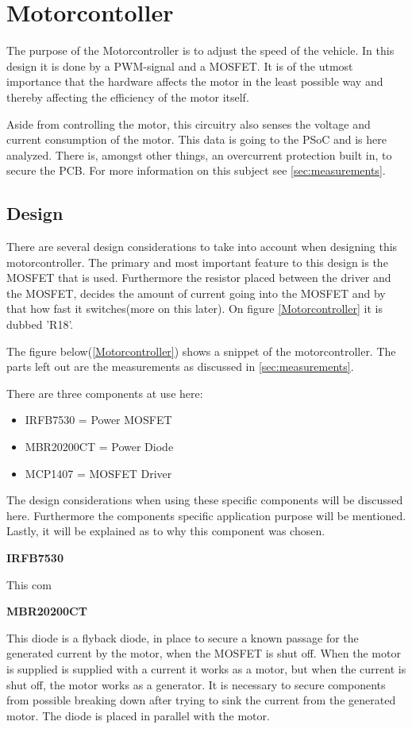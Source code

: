 \section{Motorcontoller}
The purpose of the Motorcontroller is to adjust the speed of the vehicle. In this design it is done by a PWM-signal and a MOSFET. It is of the utmost importance that the hardware affects the motor in the least possible way and thereby affecting the efficiency of the motor itself.

Aside from controlling the motor, this circuitry also senses the voltage and current consumption of the motor. This data is going to the PSoC and is here analyzed. There is, amongst other things, an overcurrent protection built in, to secure the PCB. For more information on this subject see \vref{sec:measurements}.

\subsection{Design}
There are several design considerations to take into account when designing this motorcontroller. The primary and most important feature to this design is the MOSFET that is used. Furthermore the resistor placed between the driver and the MOSFET, decides the amount of current going into the MOSFET and by that how fast it switches(more on this later). On figure \vref{Motorcontroller} it is dubbed 'R18'. 

The figure below(\vref{Motorcontroller}) shows a snippet of the motorcontroller. The parts left out are the measurements as discussed in \vref{sec:measurements}.

There are three components at use here:

\begin{itemize}
	\item{IRFB7530 = Power MOSFET}
	\item{MBR20200CT = Power Diode}
	\item{MCP1407 = MOSFET Driver}
\end{itemize}

The design considerations when using these specific components will be discussed here. Furthermore the components specific application purpose will be mentioned. Lastly, it will be explained as to why this component was chosen.  

\textbf{IRFB7530}

This com

\textbf{MBR20200CT}

This diode is a flyback diode, in place to secure a known passage for the generated current by the motor, when the MOSFET is shut off. When the motor is supplied is supplied with a current it works as a motor, but when the current is shut off, the motor works as a generator. It is necessary to secure components from possible breaking down after trying to sink the current from the generated motor. The diode is placed in parallel with the motor.

